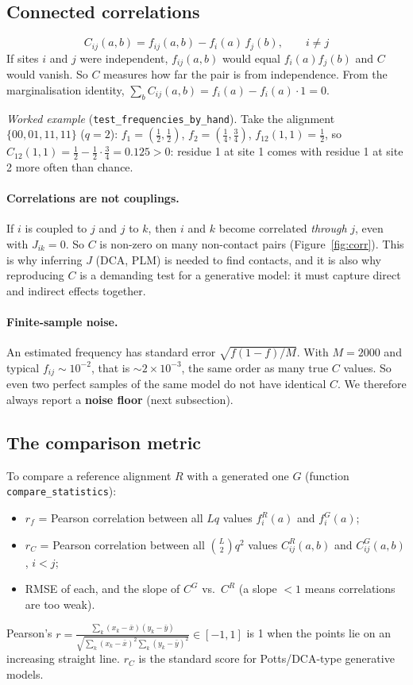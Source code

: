 \documentclass[11pt,a4paper]{article}
\begin{document}
\subsection{Connected correlations}
\begin{equation}\label{eq:C}
\boxed{\;C_{ij}(a,b) = f_{ij}(a,b) - f_i(a)\,f_j(b),\qquad i\neq j\;}
\end{equation}
If sites $i$ and $j$ were independent, $f_{ij}(a,b)$ would equal $f_i(a)f_j(b)$ and $C$ would vanish.
So $C$ measures how far the pair is from independence. From the marginalisation identity,
$\sum_b C_{ij}(a,b)=f_i(a)-f_i(a)\cdot1=0$.

\emph{Worked example} (\texttt{test\_frequencies\_by\_hand}). Take the alignment $\{00,01,11,11\}$ ($q=2$):
$f_1=(\tfrac12,\tfrac12)$, $f_2=(\tfrac14,\tfrac34)$, $f_{12}(1,1)=\tfrac12$, so
$C_{12}(1,1)=\tfrac12-\tfrac12\cdot\tfrac34=0.125>0$: residue 1 at site 1 comes with residue 1 at site 2
more often than chance.

\paragraph{Correlations are not couplings.} If $i$ is coupled to $j$ and $j$ to $k$, then $i$ and $k$
become correlated \emph{through} $j$, even with $J_{ik}=0$. So $C$ is non-zero on many non-contact
pairs (Figure~\ref{fig:corr}). This is why inferring $J$ (DCA, PLM) is needed to find contacts, and it
is also why reproducing $C$ is a demanding test for a generative model: it must capture direct and
indirect effects together.

\paragraph{Finite-sample noise.} An estimated frequency has standard error
$\sqrt{f(1-f)/M}$. With $M=2000$ and typical $f_{ij}\sim10^{-2}$, that is $\sim2\times10^{-3}$, the same
order as many true $C$ values. So even two perfect samples of the same model do not have identical
$C$. We therefore always report a \textbf{noise floor} (next subsection).

\subsection{The comparison metric}\label{sec:metric}
To compare a reference alignment $R$ with a generated one $G$ (function \texttt{compare\_statistics}):
\begin{itemize}[nosep]
  \item $r_{f}$ = Pearson correlation between all $Lq$ values $f^R_i(a)$ and $f^G_i(a)$;
  \item $r_C$ = Pearson correlation between all $\binom L2q^2$ values $C^R_{ij}(a,b)$ and $C^G_{ij}(a,b)$, $i<j$;
  \item RMSE of each, and the slope of $C^G$ vs.\ $C^R$ (a slope $<1$ means correlations are too weak).
\end{itemize}
Pearson's $r=\frac{\sum_k(x_k-\bar x)(y_k-\bar y)}{\sqrt{\sum_k(x_k-\bar x)^2\sum_k(y_k-\bar y)^2}}\in[-1,1]$
is 1 when the points lie on an increasing straight line. $r_C$ is the standard score for
Potts/DCA-type generative models.
\end{document}
